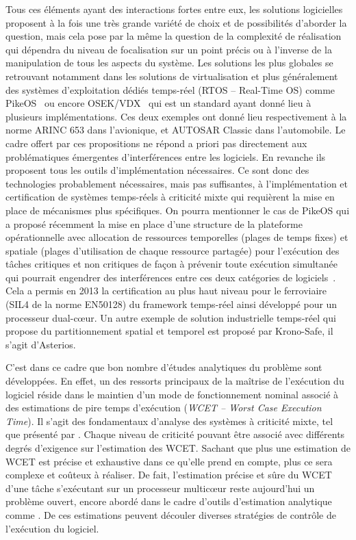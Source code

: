 \documentclass[french, a4paper, 11pt, twoside, pdftex]{StyleThese}
\begin{document}
	Tous ces éléments ayant des interactions fortes entre eux, les solutions logicielles proposent à la fois une très grande variété de choix et de possibilités d'aborder la question, mais cela pose par la même la question de la complexité de réalisation qui dépendra du niveau de focalisation sur un point précis ou à l'inverse de la manipulation de tous les aspects du système. Les solutions les plus globales se retrouvant notamment dans les solutions de virtualisation \cite{augier_real-time_2006} et plus généralement des systèmes d'exploitation dédiés temps-réel (RTOS -- Real-Time OS) comme PikeOS~\cite{kaiser_evolution_2007} ou encore OSEK/VDX~\cite{bechennec_trampoline_2006} qui est un standard ayant donné lieu à plusieurs implémentations. Ces deux exemples ont donné lieu respectivement à la norme ARINC 653 dans l'avionique, et AUTOSAR Classic dans l'automobile. Le cadre offert par ces propositions ne répond a priori pas directement aux problématiques émergentes d'interférences entre les logiciels. En revanche ils proposent tous les outils d'implémentation nécessaires. Ce sont donc des technologies probablement nécessaires, mais pas suffisantes, à l'implémentation et certification de systèmes temps-réels à criticité mixte qui requièrent la mise en place de mécanismes plus spécifiques. On pourra mentionner le cas de PikeOS qui a proposé récemment la mise en place d'une structure de la plateforme opérationnelle avec allocation de ressources temporelles (plages de temps fixes) et spatiale (plages d'utilisation de chaque ressource partagée) pour l'exécution des tâches critiques et non critiques de façon à prévenir toute exécution simultanée qui pourrait engendrer des interférences entre ces deux catégories de logiciels~\cite{sysgo_ag_arinc_2019}. Cela a permis en 2013 la certification au plus haut niveau pour le ferroviaire (SIL4 de la norme EN50128)  du framework temps-réel ainsi développé pour un processeur dual-cœur. Un autre exemple de solution industrielle temps-réel qui propose du partitionnement spatial et temporel est proposé par Krono-Safe, il s'agit d'Asterios. 
		
	C'est dans ce cadre que bon nombre d'études analytiques du problème sont développées. En effet, un des ressorts principaux de la maîtrise de l'exécution du logiciel réside dans le maintien d'un mode de fonctionnement nominal associé à des estimations de pire temps d'exécution (\textit{WCET -- Worst Case Execution Time}). Il s'agit des fondamentaux d'analyse des systèmes à criticité mixte, tel que présenté par \cite{vestal_preemptive_2007}. Chaque niveau de criticité pouvant être associé avec différents degrés d'exigence sur l'estimation des WCET. Sachant que plus une estimation de WCET est précise et exhaustive dans ce qu'elle prend en compte, plus ce sera complexe et coûteux à réaliser. De fait, l'estimation précise et sûre du WCET d'une tâche s'exécutant sur un processeur multicœur reste aujourd'hui un problème ouvert, encore abordé dans le cadre d'outils d'estimation analytique comme \cite{kastner_timeweaver_2019}. De ces estimations peuvent découler diverses stratégies de contrôle de l'exécution du logiciel.
	
\end{document}
